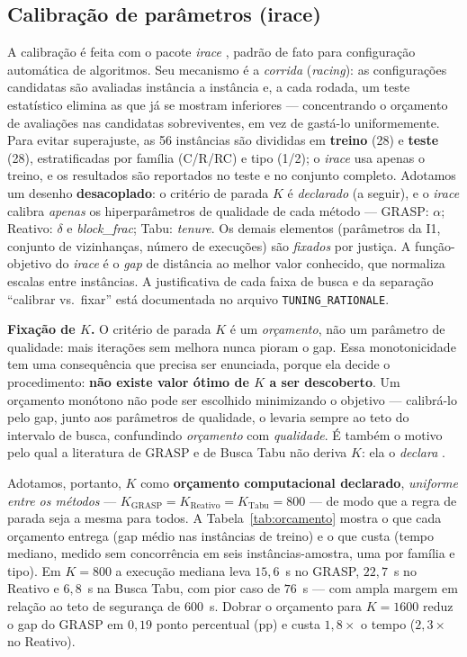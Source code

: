 \documentclass[12pt, a4paper]{article}
\newcommand{\Kgrasp}{800}
\begin{document}
\subsection{Calibração de parâmetros (irace)}\label{sec:calibracao}
A calibração é feita com o pacote \textit{irace} \citep{lopez2016irace}, padrão de fato para configuração automática de algoritmos. Seu mecanismo é a \emph{corrida} (\textit{racing}): as configurações candidatas são avaliadas instância a instância e, a cada rodada, um teste estatístico elimina as que já se mostram inferiores --- concentrando o orçamento de avaliações nas candidatas sobreviventes, em vez de gastá-lo uniformemente. Para evitar superajuste, as 56 instâncias são divididas em \textbf{treino} (28) e \textbf{teste} (28), estratificadas por família (C/R/RC) e tipo (1/2); o \textit{irace} usa apenas o treino, e os resultados são reportados no teste e no conjunto completo. Adotamos um desenho \textbf{desacoplado}: o critério de parada $K$ é \emph{declarado} (a seguir), e o \textit{irace} calibra \emph{apenas} os hiperparâmetros de qualidade de cada método --- GRASP: $\alpha$; Reativo: $\delta$ e \textit{block\_frac}; Tabu: \textit{tenure}. Os demais elementos (parâmetros da I1, conjunto de vizinhanças, número de execuções) são \emph{fixados} por justiça. A função-objetivo do \textit{irace} é o \emph{gap} de distância ao melhor valor conhecido, que normaliza escalas entre instâncias. A justificativa de cada faixa de busca e da separação ``calibrar vs.\ fixar'' está documentada no arquivo \texttt{TUNING\_RATIONALE}.

\textbf{Fixação de $K$.} O critério de parada $K$ é um \emph{orçamento}, não um parâmetro de qualidade: mais iterações sem melhora nunca pioram o gap. Essa monotonicidade tem uma consequência que precisa ser enunciada, porque ela decide o procedimento: \textbf{não existe valor ótimo de $K$ a ser descoberto}. Um orçamento monótono não pode ser escolhido minimizando o objetivo --- calibrá-lo pelo gap, junto aos parâmetros de qualidade, o levaria sempre ao teto do intervalo de busca, confundindo \emph{orçamento} com \emph{qualidade}. É também o motivo pelo qual a literatura de GRASP e de Busca Tabu não deriva $K$: ela o \emph{declara} \citep{feo1995greedy,resende2003greedy,prais2000reactive}.

Adotamos, portanto, $K$ como \textbf{orçamento computacional declarado}, \emph{uniforme entre os métodos} --- $K_{\mathrm{GRASP}} = K_{\mathrm{Reativo}} = K_{\mathrm{Tabu}} = \Kgrasp$ --- de modo que a regra de parada seja a mesma para todos. A Tabela~\ref{tab:orcamento} mostra o que cada orçamento entrega (gap médio nas instâncias de treino) e o que custa (tempo mediano, medido sem concorrência em seis instâncias-amostra, uma por família e tipo). Em $K=\Kgrasp$ a execução mediana leva $15{,}6$~s no GRASP, $22{,}7$~s no Reativo e $6{,}8$~s na Busca Tabu, com pior caso de $76$~s --- com ampla margem em relação ao teto de segurança de $600$~s. Dobrar o orçamento para $K=1600$ reduz o gap do GRASP em $0{,}19$ ponto percentual (pp) e custa $1{,}8\times$ o tempo ($2{,}3\times$ no Reativo).
\end{document}
